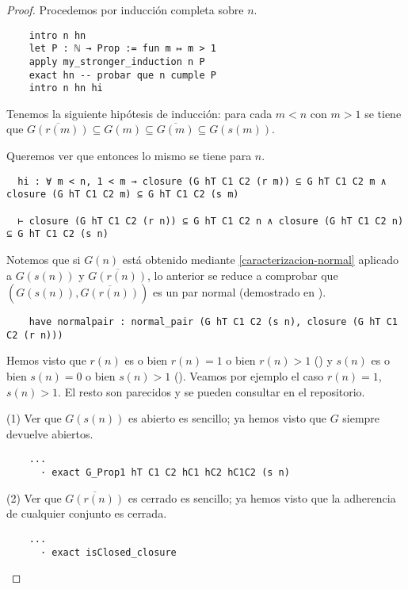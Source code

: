 \begin{proof}
  Procedemos por inducción completa sobre $n$.

  \begin{lstlisting}
    intro n hn
    let P : ℕ → Prop := fun m ↦ m > 1
    apply my_stronger_induction n P
    exact hn -- probar que n cumple P
    intro n hn hi \end{lstlisting}

  Tenemos la siguiente hipótesis de inducción: para cada $m < n$ con $m > 1$ se tiene que $\overline{G(r(m))} \subseteq G(m) \subseteq \overline{G(m)} \subseteq G(s(m))$.

  Queremos ver que entonces lo mismo se tiene para $n$.

  \begin{lstlisting}
  hi : ∀ m < n, 1 < m → closure (G hT C1 C2 (r m)) ⊆ G hT C1 C2 m ∧ closure (G hT C1 C2 m) ⊆ G hT C1 C2 (s m)

  ⊢ closure (G hT C1 C2 (r n)) ⊆ G hT C1 C2 n ∧ closure (G hT C1 C2 n) ⊆ G hT C1 C2 (s n) \end{lstlisting}

  Notemos que si $G(n)$ está obtenido mediante \ref{caracterizacion-normal} aplicado a $G(s(n))$ y $\overline{G(r(n))}$, lo anterior se reduce a comprobar que $(G(s(n)), \overline{G(r(n))})$ es un par normal (demostrado en ).

  \begin{lstlisting}
    have normalpair : normal_pair (G hT C1 C2 (s n), closure (G hT C1 C2 (r n))) \end{lstlisting}

  Hemos visto que $r(n)$ es o bien $r(n) = 1$ o bien $r(n) > 1$ () y $s(n)$ es o bien $s(n) = 0$ o bien $s(n) > 1$ (). Veamos por ejemplo el caso $r(n) = 1$, $s(n) > 1$. El resto son parecidos y se pueden consultar en el repositorio.

  (1) Ver que $G(s(n))$ es abierto es sencillo; ya hemos visto que $G$ siempre devuelve abiertos.

  \begin{lstlisting}
    ...
      · exact G_Prop1 hT C1 C2 hC1 hC2 hC1C2 (s n) \end{lstlisting}

  (2) Ver que $\overline{G(r(n))}$ es cerrado es sencillo; ya hemos visto que la adherencia de cualquier conjunto es cerrada.

  \begin{lstlisting}
    ...
      · exact isClosed_closure \end{lstlisting}


\end{proof}
